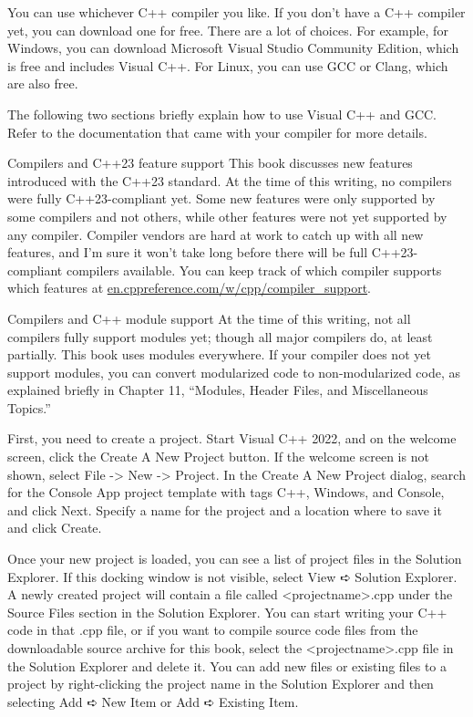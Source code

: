 
You can use whichever C++ compiler you like. If you don’t have a C++ compiler yet, you can download one for free. There are a lot of choices. For example, for Windows, you can download Microsoft Visual Studio Community Edition, which is free and includes Visual C++. For Linux, you can use GCC or Clang, which are also free.

The following two sections briefly explain how to use Visual C++ and GCC. Refer to the documentation that came with your compiler for more details.

\begin{myTip}{Compilers and C++23 feature support}
This book discusses new features introduced with the C++23 standard. At the time of this writing, no compilers were fully C++23-compliant yet. Some new features were only supported by some compilers and not others, while other features were not yet supported by any compiler. Compiler vendors are hard at work to catch up with all new features, and I’m sure it won’t take long before there will be full C++23-compliant compilers available. You can keep track of which compiler supports which features at \url{en.cppreference.com/w/cpp/compiler_support}.
\end{myTip}

\begin{myTip}{Compilers and C++ module support}
At the time of this writing, not all compilers fully support modules yet; though all major compilers do, at least partially. This book uses modules everywhere. If your compiler does not yet support modules, you can convert modularized code to non-modularized code, as explained briefly in Chapter 11, “Modules, Header Files, and Miscellaneous Topics.”
\end{myTip}


First, you need to create a project. Start Visual C++ 2022, and on the welcome screen, click the Create A New Project button. If the welcome screen is not shown, select File -> New -> Project. In the Create A New Project dialog, search for the Console App project template with tags C++, Windows, and Console, and click Next. Specify a name for the project and a location where to save it and click Create.

Once your new project is loaded, you can see a list of project files in the Solution Explorer. If this docking window is not visible, select View ➪ Solution Explorer. A newly created project will contain a file called <projectname>.cpp under the Source Files section in the Solution Explorer. You can start writing your C++ code in that .cpp file, or if you want to compile source code files from the downloadable source archive for this book, select the <projectname>.cpp file in the Solution Explorer and delete it. You can add new files or existing files to a project by right-clicking the project name in the Solution Explorer and then selecting Add ➪ New Item or Add ➪ Existing Item.

